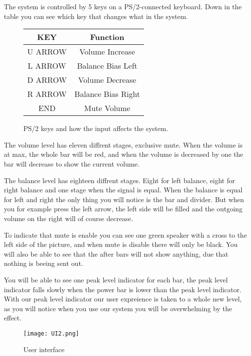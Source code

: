 The system is controlled by 5 keys on a PS/2-connected keyboard. Down in the table you can see which key that changes what in the system.


\begin{figure}[h]
\centering
\begin{tabular}{|c|c|}
\hline
KEY & Function\\ \hline
U ARROW & Volume Increase\\ \hline
L ARROW & Balance Bias Left\\ \hline
D ARROW &  Volume Decrease\\ \hline
R ARROW &  Balance Bias Right\\ \hline
END		&  Mute Volume\\ \hline
\end{tabular}
\caption{PS/2 keys and how the input affects the system.}
\label{fig:scancodes}
\end{figure}


The volume level has eleven diffrent stages, exclusive mute. When the volume is at max, the whole bar will be red, and when the volume is decreased by one the bar will decrease to show the current volume.

The balance level has eighteen diffrent stages. Eight for left balance, eight for right balance and one stage when the signal is equal. When the balance is equal for left and right the only thing you will notice is the bar and divider. But when you for example press the left arrow, the left side will be filled and the outgoing volume on the right will of course decrease.

To indicate that mute is enable you can see one green speaker with a cross to the left side of the picture, and when mute is disable there will only be black. You will also be able to see that the after bars will not show anything, due that nothing is beeing sent out. 

You will be able to see one peak level indicator for each bar, the peak level indicator falls slowly when the power bar is lower than the peak level indicator. With our peak level indicator our user expreience is taken to a whole new level, as you will notice when you use our system you will be overwhelming by the effect.

\begin{figure}[h]
	\centering
        \texttt{[image: UI2.png]}
       \caption{User interface}
        \label{fig:user interface}
\end{figure}


